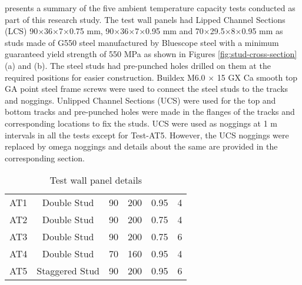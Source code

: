  presents a summary of the five ambient temperature capacity tests conducted as part of this research study. The test wall panels had Lipped Channel Sections (LCS) 90$\times$36$\times$7$\times$0.75 mm, 90$\times$36$\times$7$\times$0.95 mm and 70$\times$29.5$\times$8$\times$0.95 mm as studs made of G550 steel manufactured by Bluescope steel with a minimum guaranteed yield strength of 550 MPa as shown in Figures \ref{fig:stud-cross-section} (a) and (b). The steel studs had pre-punched holes drilled on them at the required positions for easier construction. Buildex M6.0 $\times$ 15 GX Ca smooth top GA point steel frame screws were used to connect the steel studs to the tracks and noggings. Unlipped Channel Sections (UCS) were used for the top and bottom tracks and pre-punched holes were made in the flanges of the tracks and corresponding locations to fix the studs. UCS were used as noggings at 1 m intervals in all the tests except for Test-AT5. However, the UCS noggings were replaced by omega noggings and details about the same are provided in the corresponding section.
\begin{table}[!htbp]
	\centering
	\caption{Test wall panel details}
	\begin{tabular}{cccccc}
		\toprule
		\multicolumn{1}{m{2.4em}}{\centering{Test Name}} & 
		\multicolumn{1}{m{5.6em}}{\centering{Description}} & 
		\multicolumn{1}{m{2.85em}}{\centering{Stud Depth (mm)}} & 
		\multicolumn{1}{m{2.85em}}{\centering{Cavity Depth (mm)}} & 
		\multicolumn{1}{m{5em}}{\centering{Stud Thickness (mm)}} & 
		\multicolumn{1}{m{3em}}{\centering{No of Studs}} \\
		\midrule
		AT1  & Double Stud & 90 & 200 & 0.95 & 4 \\
		AT2  & Double Stud & 90 & 200 & 0.75 & 4 \\
		AT3  & Double Stud & 90 & 200 & 0.75 & 6 \\
		AT4  & Double Stud & 70 & 160 & 0.95 & 4 \\
		AT5  & Staggered Stud & 90 & 200 & 0.95 & 6 \\
		\bottomrule
	\end{tabular}%
	\label{tab:ambient-test-specimens}%
\end{table}%

